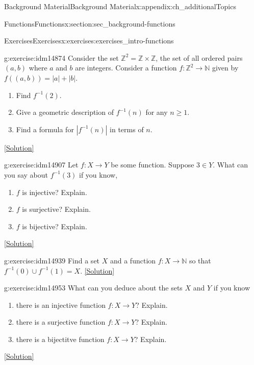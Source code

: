 \documentclass[oneside,10pt,]{book}
\numberwithin{equation}{chapter}
\def\N{\mathbb N}
\def\Z{\mathbb Z}
\def\inv{^{-1}}
\begin{document}
\begin{appendixptx}{Background Material}{}{Background Material}{}{}{x:appendix:ch_additionalTopics}
\begin{sectionptx}{Functions}{}{Functions}{}{}{x:section:sec_background-functions}
\begin{exercises-subsection}{Exercises}{}{Exercises}{}{}{x:exercises:exercises_intro-functions}
\begin{divisionexercise}{8}{}{}{g:exercise:idm14874}
Consider the set \(\Z^2 = \Z \times \Z\), the set of all ordered pairs \((a,b)\) where \(a\) and \(b\) are integers.  Consider a function \(f: \Z^2 \to \N\) given by \(f((a,b)) = |a| + |b|\).%
\begin{enumerate}[label=(\alph*)]
\item{}Find \(f\inv(2)\).%
\item{}Give a geometric description of \(f\inv(n)\) for any \(n \ge 1\).%
\item{}Find a formula for \(|f\inv(n)|\) in terms of \(n\).%
\end{enumerate}
%
\space\hspace*{0pt}\hfill{\tiny\hyperlink{g:solution:idm14895-main}{[Solution]}}\end{divisionexercise}%
\begin{divisionexercise}{9}{}{}{g:exercise:idm14907}%
Let \(f:X \to Y\) be some function. Suppose \(3 \in Y\). What can you say about \(f\inv(3)\) if you know,%
\begin{enumerate}[label=(\alph*)]
\item{}\(f\) is injective? Explain.%
\item{}\(f\) is surjective? Explain.%
\item{}\(f\) is bijective? Explain.%
\end{enumerate}
%
\space\hspace*{0pt}\hfill{\tiny\hyperlink{g:solution:idm14923-main}{[Solution]}}\end{divisionexercise}%
\begin{divisionexercise}{10}{}{}{g:exercise:idm14939}%
Find a set \(X\) and a function \(f:X \to \N\) so that \(f\inv(0) \cup f\inv(1) = X\).%
\space\hspace*{0pt}\hfill{\tiny\hyperlink{g:solution:idm14945-main}{[Solution]}}\end{divisionexercise}%
\begin{divisionexercise}{11}{}{}{g:exercise:idm14953}%
What can you deduce about the sets \(X\) and \(Y\) if you know \textellipsis{}%
\begin{enumerate}[label=(\alph*)]
\item{}there is an injective function \(f:X \to Y\)? Explain.%
\item{}there is a surjective function \(f:X \to Y\)? Explain.%
\item{}there is a bijectitve function \(f:X \to Y\)? Explain.%
\end{enumerate}
%
\space\hspace*{0pt}\hfill{\tiny\hyperlink{g:solution:idm14969-main}{[Solution]}}\end{divisionexercise}%

\end{exercises-subsection}
\end{sectionptx}
\end{appendixptx}
\end{document}

